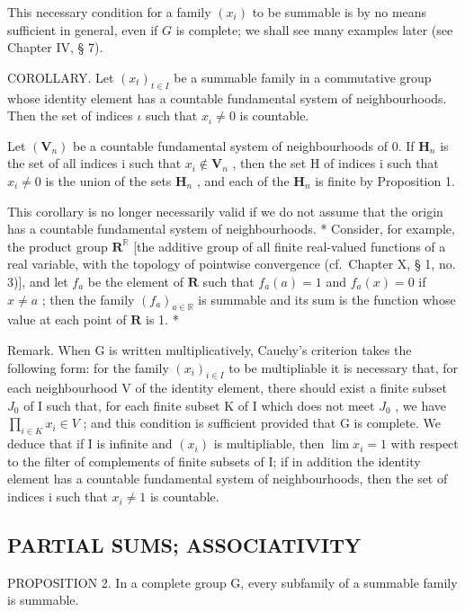 This necessary condition for a family \((x_{i})\) to be summable is by no means sufficient in general, even if \(G\) is complete; we shall see many examples later (see Chapter IV, § 7).

COROLLARY. Let \((x_{t})_{t\in I}\) be a summable family in a commutative group whose identity element has a countable fundamental system of neighbourhoods. Then the set of indices \(\iota\) such that \(x_{\iota}\neq 0\) is countable.

Let \((\mathbf{V}_{n})\) be a countable fundamental system of neighbourhoods of 0. If \(\mathbf{H}_{n}\) is the set of all indices i such that \(x_{i} \notin \mathbf{V}_{n}\) , then the set H of indices i such that \(x_{i} \neq 0\) is the union of the sets \(\mathbf{H}_{n}\) , and each of the \(\mathbf{H}_{n}\) is finite by Proposition 1.

This corollary is no longer necessarily valid if we do not assume that the origin has a countable fundamental system of neighbourhoods. * Consider, for example, the product group \(\mathbf{R}^{\mathbb{R}}\) {[}the additive group of all finite real-valued functions of a real variable, with the topology of pointwise convergence (cf.~Chapter X, § 1, no. 3){]}, and let \(f_{a}\) be the element of \(\mathbf{R}\) such that \(f_{a}(a)=1\) and \(f_{a}(x)=0\) if \(x\neq a\) ; then the family \((f_{a})_{a\in\mathbb{R}}\) is summable and its sum is the function whose value at each point of \(\mathbf{R}\) is 1. *

Remark. When G is written multiplicatively, Cauchy's criterion takes the following form: for the family \((x_{i})_{i\in I}\) to be multipliable it is necessary that, for each neighbourhood V of the identity element, there should exist a finite subset \(J_{0}\) of I such that, for each finite subset K of I which does not meet \(J_{0}\) , we have \(\prod_{i\in K}x_{i}\in V\) ; and this condition is sufficient provided that G is complete. We deduce that if I is infinite and \((x_{i})\) is multipliable, then \(\lim x_{i}=1\) with respect to the filter of complements of finite subsets of I; if in addition the identity element has a countable fundamental system of neighbourhoods, then the set of indices i such that \(x_{i}\neq1\) is countable.

\subsection{PARTIAL SUMS; ASSOCIATIVITY}

PROPOSITION 2. In a complete group G, every subfamily of a summable family is summable.

